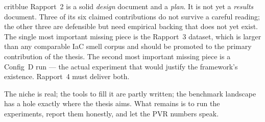 \documentclass[11pt, a4paper]{report}
\begin{document}
\begin{gradebox}{critblue}
Rapport~2 is a solid \emph{design} document and a \emph{plan}. It is not
yet a \emph{results} document. Three of its six claimed contributions do
not survive a careful reading; the other three are defensible but need
empirical backing that does not yet exist. The single most important
missing piece is the Rapport~3 dataset, which is larger than any
comparable IaC smell corpus and should be promoted to the primary
contribution of the thesis. The second most important missing piece is
a Config~D run --- the actual experiment that would justify the
framework's existence. Rapport~4 must deliver both.
\end{gradebox}

The niche is real; the tools to fill it are partly written; the
benchmark landscape has a hole exactly where the thesis aims. What
remains is to run the experiments, report them honestly, and let the
PVR numbers speak.


\end{document}

